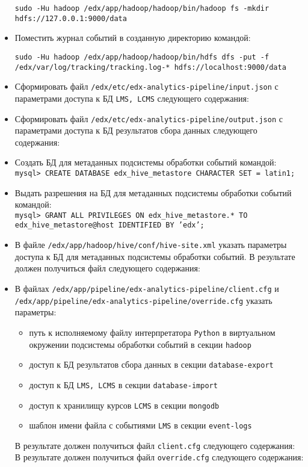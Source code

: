 \begin{itemize}
	\begin{sloppypar}
		\texttt{sudo -Hu hadoop /edx/app/hadoop/hadoop/bin/hadoop fs -mkdir hdfs://127.0.0.1:9000/data}
	\end{sloppypar}
	\item Поместить журнал событий в созданную директорию командой:\\
	\begin{sloppypar}
		\texttt{sudo -Hu hadoop /edx/app/hadoop/hadoop/bin/hdfs dfs -put -f /edx/var/log/tracking/tracking.log-* hdfs://localhost:9000/data}	
	\end{sloppypar}		
	\item Сформировать файл \texttt{/edx/etc/edx-analytics-pipeline/input.json} с параметрами доступа к БД \texttt{LMS, LCMS} следующего содержания:
		
	\item Сформировать файл \texttt{/edx/etc/edx-analytics-pipeline/output.json} с параметрами доступа к БД результатов сбора данных следующего содержания:
	
	\item Создать БД для метаданных подсистемы обработки событий командой:\\
		\texttt{mysql> CREATE DATABASE edx\_hive\_metastore CHARACTER SET = latin1;}	
	\item Выдать разрешения на БД для метаданных подсистемы обработки событий командой:\\
		\texttt{mysql> GRANT ALL PRIVILEGES ON edx\_hive\_metastore.* TO edx\_hive\_metastore@host IDENTIFIED BY 'edx';}			
	\item В файле \texttt{/edx/app/hadoop/hive/conf/hive-site.xml} указать параметры доступа к БД для метаданных подсистемы обработки событий. В результате должен получиться файл следующего содержания:\\
		
	\item В файлах \texttt{/edx/app/pipeline/edx-analytics-pipeline/client.cfg} и \texttt{/edx/app/pipeline/edx-analytics-pipeline/override.cfg} указать параметры:
	\begin{itemize}
		\item путь к исполняемому файлу интерпретатора \texttt{Python} в виртуальном окружении подсистемы обработки событий в секции \texttt{hadoop}
		\item доступ к БД результатов сбора данных в секции \texttt{database-export}
		\item доступ к БД \texttt{LMS, LCMS} в секции \texttt{database-import}
		\item доступ к хранилищу курсов \texttt{LCMS} в секции \texttt{mongodb}
		\item шаблон имени файла с событиями \texttt{LMS} в секции \texttt{event-logs}
	\end{itemize}
	 В результате должен получиться файл \texttt{client.cfg} следующего содержания:\\
			
	 В результате должен получиться файл \texttt{override.cfg} следующего содержания:\\		
		
\end{itemize}
